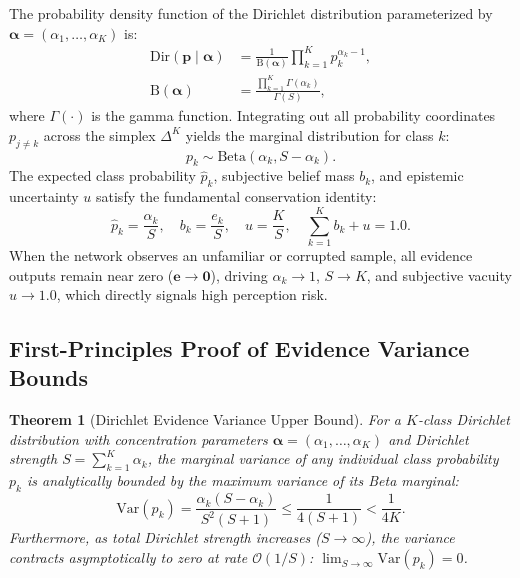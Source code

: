 \documentclass[conference]{IEEEtran}
\newtheorem{theorem}{Theorem}
\begin{document}
The probability density function of the Dirichlet distribution parameterized by $\boldsymbol{\alpha} = (\alpha_1, \dots, \alpha_K)$ is:
\begin{align}
\mathrm{Dir}(\mathbf{p} \mid \boldsymbol{\alpha}) &= \frac{1}{\mathrm{B}(\boldsymbol{\alpha})} \prod_{k=1}^K p_k^{\alpha_k - 1}, \\
\mathrm{B}(\boldsymbol{\alpha}) &= \frac{\prod_{k=1}^K \Gamma(\alpha_k)}{\Gamma(S)},
\end{align}
where $\Gamma(\cdot)$ is the gamma function. Integrating out all probability coordinates $p_{j \ne k}$ across the simplex $\Delta^K$ yields the marginal distribution for class $k$:
\begin{equation}
p_k \sim \mathrm{Beta}(\alpha_k, S - \alpha_k).
\end{equation}
The expected class probability $\hat{p}_k$, subjective belief mass $b_k$, and epistemic uncertainty $u$ satisfy the fundamental conservation identity:
\begin{equation}
\hat{p}_k = \frac{\alpha_k}{S}, \quad b_k = \frac{e_k}{S}, \quad u = \frac{K}{S}, \quad \sum_{k=1}^K b_k + u = 1.0.
\end{equation}
When the network observes an unfamiliar or corrupted sample, all evidence outputs remain near zero ($\mathbf{e} \to \mathbf{0}$), driving $\alpha_k \to 1$, $S \to K$, and subjective vacuity $u \to 1.0$, which directly signals high perception risk.

\subsection{First-Principles Proof of Evidence Variance Bounds}
\begin{theorem}[Dirichlet Evidence Variance Upper Bound]
\label{thm:dirichlet_variance}
For a $K$-class Dirichlet distribution with concentration parameters $\boldsymbol{\alpha} = (\alpha_1, \dots, \alpha_K)$ and Dirichlet strength $S = \sum_{k=1}^K \alpha_k$, the marginal variance of any individual class probability $p_k$ is analytically bounded by the maximum variance of its Beta marginal:
\begin{equation}
\mathrm{Var}(p_k) = \frac{\alpha_k (S - \alpha_k)}{S^2 (S + 1)} \le \frac{1}{4(S + 1)} < \frac{1}{4K}.
\end{equation}
Furthermore, as total Dirichlet strength increases ($S \to \infty$), the variance contracts asymptotically to zero at rate $\mathcal{O}(1/S)$: $\lim_{S \to \infty} \mathrm{Var}(p_k) = 0$.
\end{theorem}
\end{document}
